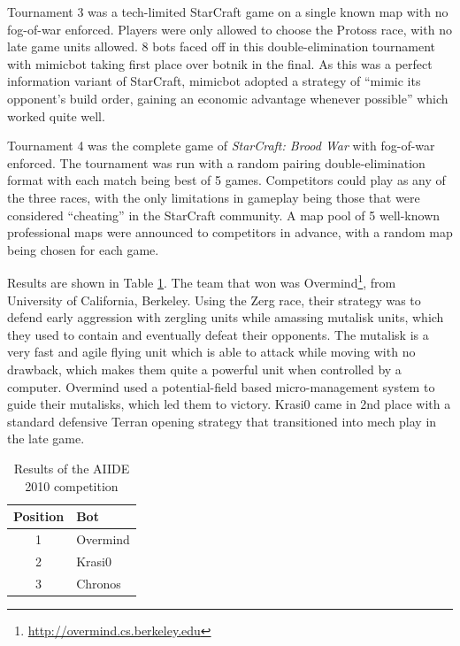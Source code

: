 \documentclass[journal]{IEEEtran}
\begin{document}
Tournament 3 was a tech-limited StarCraft game on a single known map with no fog-of-war enforced. Players
were only allowed to choose the Protoss race, with no late game units allowed. 8 bots
faced off in this double-elimination tournament with mimicbot taking first place over botnik in the final.
As this was a perfect information variant of StarCraft, mimicbot adopted a strategy of
``mimic its opponent's build order, gaining an economic advantage whenever possible'' which
worked quite well.

Tournament 4 was the complete game of {\em StarCraft: Brood War} with fog-of-war enforced. The tournament
was run with a random pairing double-elimination format with each match being best of 5 games.
Competitors could play as any of the three races, with the only limitations in gameplay
being those that were considered ``cheating'' in the StarCraft community. A map pool of
5 well-known professional maps were announced to competitors in advance, with a random map being chosen for each game.

Results are shown in Table \ref{tab:aiide2010}. The team that won was Overmind\footnote{\url{http://overmind.cs.berkeley.edu}}, from University of California, Berkeley. Using the Zerg race, their
strategy was to defend early aggression with zergling units while amassing mutalisk units,
which they used to contain and eventually defeat their opponents. The mutalisk is a very fast and agile
flying unit which is able to attack while moving with no drawback, which makes them quite a powerful
unit when controlled by a computer. Overmind used a potential-field
based micro-management system to guide their mutalisks, which led them to victory. Krasi0 came in 2nd place
with a standard defensive Terran opening strategy that transitioned into mech play in the late game.

\begin{table}[!t]
\caption{Results of the AIIDE 2010 competition}
\label{tab:aiide2010}
\centering
\begin{tabular}{|c|l|}
\hline
{\bfseries Position} & {\bfseries Bot}\\
\hline
1 & Overmind \\
2 & Krasi0 \\
3 & Chronos \\
\hline
\end{tabular}
\end{table}
\end{document}
